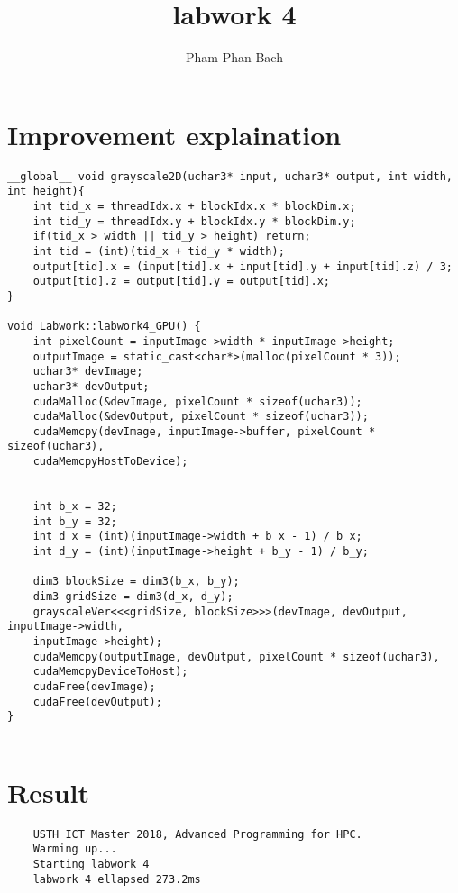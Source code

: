 \documentclass{article}
\title{labwork 4}
\author{Pham Phan Bach }
\begin{document}
\maketitle
    

\section{Improvement explaination}
\begin{verbatim}
__global__ void grayscale2D(uchar3* input, uchar3* output, int width, 
int height){
	int tid_x = threadIdx.x + blockIdx.x * blockDim.x;
	int tid_y = threadIdx.y + blockIdx.y * blockDim.y;
	if(tid_x > width || tid_y > height) return;
	int tid = (int)(tid_x + tid_y * width);
	output[tid].x = (input[tid].x + input[tid].y + input[tid].z) / 3;
	output[tid].z = output[tid].y = output[tid].x;
}

void Labwork::labwork4_GPU() {
	int pixelCount = inputImage->width * inputImage->height;
	outputImage = static_cast<char*>(malloc(pixelCount * 3));
	uchar3* devImage;
    uchar3*	devOutput;
	cudaMalloc(&devImage, pixelCount * sizeof(uchar3));
	cudaMalloc(&devOutput, pixelCount * sizeof(uchar3));
	cudaMemcpy(devImage, inputImage->buffer, pixelCount * sizeof(uchar3),
	cudaMemcpyHostToDevice);


	int b_x = 32;
	int b_y = 32;
	int d_x = (int)(inputImage->width + b_x - 1) / b_x;
	int d_y = (int)(inputImage->height + b_y - 1) / b_y;
	
	dim3 blockSize = dim3(b_x, b_y);
	dim3 gridSize = dim3(d_x, d_y);
	grayscaleVer<<<gridSize, blockSize>>>(devImage, devOutput, inputImage->width, 
	inputImage->height);
	cudaMemcpy(outputImage, devOutput, pixelCount * sizeof(uchar3), 
	cudaMemcpyDeviceToHost);
	cudaFree(devImage);
	cudaFree(devOutput);
}


\end{verbatim}{}


\section{Result}
\begin{verbatim}
    USTH ICT Master 2018, Advanced Programming for HPC.
    Warming up...
    Starting labwork 4
    labwork 4 ellapsed 273.2ms
\end{verbatim}{}
\end{document}
